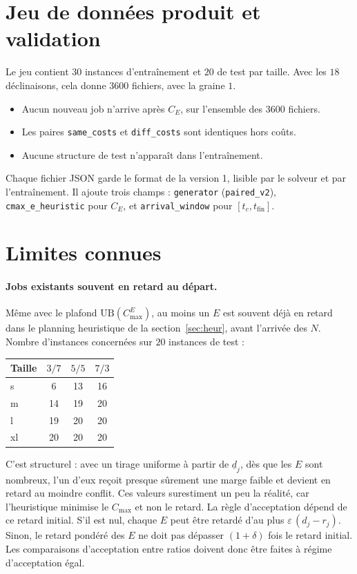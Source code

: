 \documentclass[11pt,a4paper]{article}
\newcommand{\UB}{\mathrm{UB}}
\newcommand{\CE}{C_E}
\begin{document}
\section{Jeu de données produit et validation}

Le jeu contient $30$ instances d'entraînement et $20$ de test par taille.
Avec les $18$ déclinaisons, cela donne $3600$ fichiers, avec la graine $1$.
\begin{itemize}
  \item Aucun nouveau job n'arrive après $\CE$, sur l'ensemble des $3600$ fichiers.
  \item Les paires \texttt{same\_costs} et \texttt{diff\_costs} sont identiques hors coûts.
  \item Aucune structure de test n'apparaît dans l'entraînement.
\end{itemize}

Chaque fichier JSON garde le format de la version 1, lisible par le solveur et par l'entraînement.
Il ajoute trois champs : \texttt{generator} (\texttt{paired\_v2}), \texttt{cmax\_e\_heuristic} pour $\CE$, et \texttt{arrival\_window} pour $[t_c, t_{\mathrm{fin}}]$.

\section{Limites connues}
\label{sec:limits}

\paragraph{Jobs existants souvent en retard au départ.}
Même avec le plafond $\UB(C^E_{\max})$, au moins un $E$ est souvent déjà en retard dans le planning heuristique de la section~\ref{sec:heur}, avant l'arrivée des $N$. Nombre d'instances concernées sur $20$ instances de test :
\begin{center}
\begin{tabular}{lccc}
\toprule
Taille & $3/7$ & $5/5$ & $7/3$ \\
\midrule
s  & 6  & 13 & 16 \\
m  & 14 & 19 & 20 \\
l  & 19 & 20 & 20 \\
xl & 20 & 20 & 20 \\
\bottomrule
\end{tabular}
\end{center}
C'est structurel : avec un tirage uniforme à partir de $\underline{d}_j$, dès que les $E$ sont nombreux, l'un d'eux reçoit presque sûrement une marge faible et devient en retard au moindre conflit.
Ces valeurs surestiment un peu la réalité, car l'heuristique minimise le $C_{\max}$ et non le retard.
La règle d'acceptation dépend de ce retard initial.
S'il est nul, chaque $E$ peut être retardé d'au plus $\varepsilon\,(d_j - r_j)$.
Sinon, le retard pondéré des $E$ ne doit pas dépasser $(1+\delta)$ fois le retard initial.
Les comparaisons d'acceptation entre ratios doivent donc être faites à régime d'acceptation égal.
\end{document}
